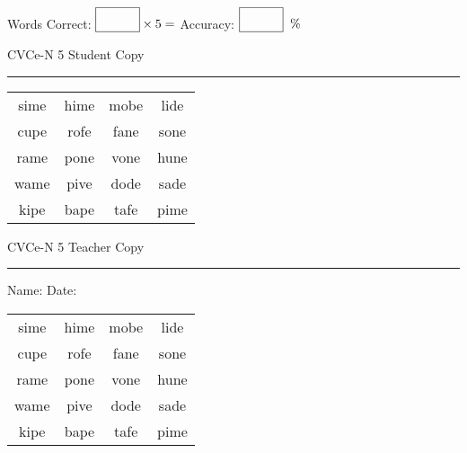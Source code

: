\documentclass{memoir}
\begin{document}
\small

Words Correct: $\fbox{\phantom{\huge 100}} \times 5 = $ Accuracy: $\fbox{\phantom{\huge 100}}\;\; \%$ 

\vfill

\newpage


\footnotesize \noindent
CVCe-N 5 \hfill Student Copy
\smallskip
\hrule

\Large

\setlength{\tabcolsep}{14pt}
\def\arraystretch{2}

{\selectfont


\begin{vplace}[0.5]
\begin{center}
\begin{tabular}{cccc}
sime & hime & mobe & lide \\
cupe & rofe & fane & sone \\
rame & pone & vone & hune \\
wame & pive & dode & sade \\
kipe & bape & tafe & pime \\
\end{tabular}
\end{center}
\end{vplace}

}

\newpage

\footnotesize \noindent
CVCe-N 5 \hfill Teacher Copy
\smallskip
\hrule

\small

\vfill

\noindent
Name: \underline{\hspace{1.75in}} \hfill Date: \underline{\hspace{1in}}

\Large

{\selectfont


\begin{vplace}[0.5]
\begin{center}
\begin{tabular}{cccc}
sime & hime & mobe & lide \\
cupe & rofe & fane & sone \\
rame & pone & vone & hune \\
wame & pive & dode & sade \\
kipe & bape & tafe & pime \\
\end{tabular}
\end{center}
\end{vplace}



}
\end{document}
